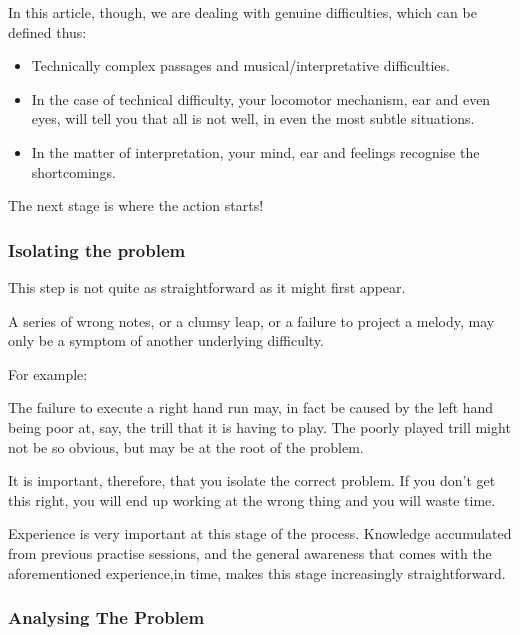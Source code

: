 \documentclass{article}
\begin{document}

In this article, though, we are dealing with genuine difficulties, which can be defined thus:

\begin{itemize}
    \item Technically complex passages and musical/interpretative difficulties.
    \item In the case of technical difficulty, your locomotor mechanism, ear and even eyes, will tell you that all is not well, in even the most subtle situations.
    \item In the matter of interpretation, your mind, ear and feelings recognise the shortcomings.
\end{itemize}

The next stage is where the action starts!

\subsubsection{Isolating the problem}

This step is not quite as straightforward as it might first appear.

A series of wrong notes, or a clumsy leap, or a failure to project a melody, may only be a symptom of another underlying difficulty.

For example:

The failure to execute a right hand run may, in fact be caused by the left hand being poor at, say, the trill that it is having to play.
The poorly played trill might not be so obvious, but may be at the root of the problem.

It is important, therefore, that you isolate the correct problem.\footnotemark
{}
If you don't get this right, you will end up working at the wrong thing and you will waste time.

Experience is very important at this stage of the process.
Knowledge accumulated  from previous practise sessions, and the general awareness that comes with the aforementioned experience,in time, makes this stage increasingly straightforward.

\subsubsection{Analysing The Problem}
\end{document}
